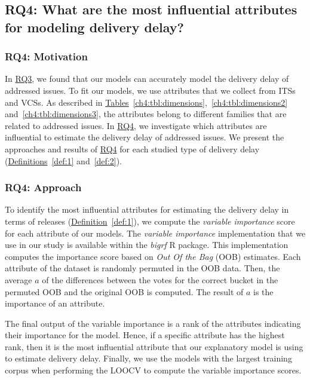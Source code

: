 \subsection{RQ4: What are the most influential attributes for
modeling delivery delay?}\label{ch4:rq4}

\subsubsection*{RQ4: Motivation} In \hyperref[ch4:rq3]{RQ3}, we found that our
models can accurately model the delivery delay of addressed issues. To fit our
models, we use attributes that we collect from ITSs and VCSs. As described in
\hyperref[ch4:tbl:dimensions]{Tables}~\ref{ch4:tbl:dimensions},~\ref{ch4:tbl:dimensions2}
and~\ref{ch4:tbl:dimensions3}, the attributes belong to different families that
are related to addressed issues. In \hyperref[ch4:rq4]{RQ4}, we investigate
which attributes are influential to estimate the delivery delay of addressed
issues. We present the approaches and results of \hyperref[ch4:rq4]{RQ4} for
each studied type of delivery delay (\hyperref[def:1]{Definitions}~\ref{def:1}
and~\ref{def:2}). 

\subsubsection*{RQ4: Approach}

To identify the most influential attributes for estimating the delivery delay
in terms of releases (\hyperref[def:1]{Definition}~\ref{def:1}), we compute the
\textit{variable importance} score for each attribute of our models. The
\textit{variable importance} implementation that we use in our study is
available within the \textit{bigrf} R package. This implementation computes the
importance score based on {\em Out Of the Bag} (OOB) estimates. Each attribute
of the dataset is randomly permuted in the OOB data.  Then, the average \(a\) of
the differences between the votes for the correct bucket in the permuted OOB and
the original OOB is computed. The result of \(a\) is the importance of an
attribute. 

The final output of the variable importance is a rank of the attributes
indicating their importance for the model. Hence, if a specific attribute has
the highest rank, then it is the most influential attribute that our explanatory
model is using to estimate delivery delay. Finally, we use the models with the
largest training corpus when performing the LOOCV to compute the variable
importance scores.

